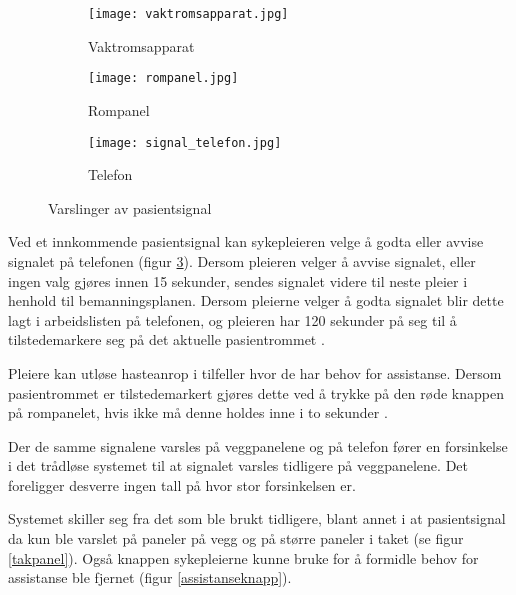 \begin{figure}[H]
        \centering
         \begin{subfigure}[b]{0.3\textwidth}
        		\centering
                \texttt{[image: vaktromsapparat.jpg]}
                \caption{Vaktromsapparat}
                \label{rompanel}
        \end{subfigure}
        \begin{subfigure}[b]{0.3\textwidth}
        		\centering
                \texttt{[image: rompanel.jpg]}
                \caption{Rompanel}
                \label{rompanel}
        \end{subfigure}
          \begin{subfigure}[b]{0.3\textwidth}
        		\centering
                \texttt{[image: signal\_telefon.jpg]}
                \caption{Telefon}
                \label{signal_telefon}
        \end{subfigure}      
        \caption{Varslinger av pasientsignal}
        \label{varslinger}
\end{figure}

\noindent
Ved et innkommende pasientsignal kan sykepleieren velge å godta eller avvise signalet på telefonen (figur \ref{signal_telefon}). Dersom pleieren velger å avvise signalet, eller ingen valg gjøres innen 15 sekunder, sendes signalet videre til neste pleier i henhold til bemanningsplanen. Dersom pleierne velger å godta signalet blir dette lagt i arbeidslisten på telefonen, og pleieren har 120 sekunder på seg til å tilstedemarkere seg på det aktuelle pasientrommet \citep{BrukermanualforPasientsignalogPasientsignalapplikasjon}. 

\noindent
Pleiere kan utløse hasteanrop i tilfeller hvor de har behov for assistanse. Dersom pasientrommet er tilstedemarkert gjøres dette ved å trykke på den røde knappen på rompanelet, hvis ikke må denne holdes inne i to sekunder \citep{BrukerveiledningforPasientsignal}.

\noindent
Der de samme signalene varsles på veggpanelene og på telefon fører en forsinkelse i det trådløse systemet til at signalet varsles tidligere på veggpanelene. Det foreligger desverre ingen tall på hvor stor forsinkelsen er. 

\noindent
Systemet skiller seg fra det som ble brukt tidligere, blant annet i at pasientsignal da kun ble varslet på paneler på vegg og på større paneler i taket (se figur \ref{takpanel}). Også knappen sykepleierne kunne bruke for å formidle behov for assistanse ble fjernet (figur \ref{assistanseknapp}). 

